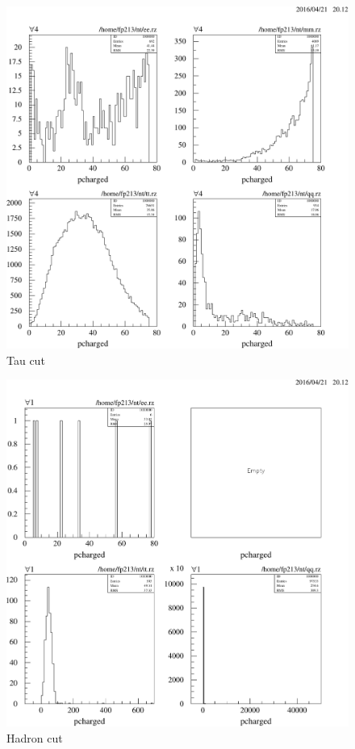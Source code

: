 \documentclass[11pt, a4paper]{article}
\numberwithin{equation}{section}
\begin{document}
\begin{appendix}
\begin{figure}
	\centering
	\includegraphics[width=1\textwidth]{./data/tag2/final_cuts/cropped/tau_cut.pdf}
	\caption{Tau cut}
\end{figure}

\begin{figure}
	\centering
	\includegraphics[width=1\textwidth]{./data/tag2/final_cuts/cropped/hadron_cut.pdf}
	\caption{Hadron cut}
\end{figure}






\end{appendix}
\end{document}
